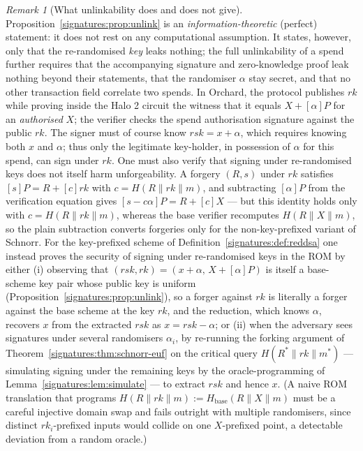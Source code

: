 \documentclass[11pt,a4paper]{article}
\theoremstyle{definition}
\theoremstyle{remark}
\newtheorem{remark}[theorem]{Remark}
\begin{document}
\begin{remark}[What unlinkability does and does not give]\label{signatures:rem:unlink}
Proposition~\ref{signatures:prop:unlink} is an \emph{information-theoretic} (perfect) statement: it does not rest on any computational assumption. It states, however, only that the re-randomised \emph{key} leaks nothing; the full unlinkability of a spend further requires that the accompanying signature and zero-knowledge proof leak nothing beyond their statements, that the randomiser \(\alpha\) stay secret, and that no other transaction field correlate two spends. In Orchard, the protocol publishes \(\mathit{rk}\) while proving inside the Halo 2 circuit the witness that it equals \(X + [\alpha]P\) for an \emph{authorised} \(X\); the verifier checks the spend authorisation signature against the public \(\mathit{rk}\). The signer must of course know \(\mathit{rsk} = x + \alpha\), which requires knowing both \(x\) and \(\alpha\); thus only the legitimate key-holder, in possession of \(\alpha\) for this spend, can sign under \(\mathit{rk}\). One must also verify that signing under re-randomised keys does not itself harm unforgeability. A forgery \((R, s)\) under \(\mathit{rk}\) satisfies \([s]P = R + [c]\mathit{rk}\) with \(c = H(R \| \mathit{rk} \| m)\), and subtracting \([\alpha]P\) from the verification equation gives \([s - c\alpha]P = R + [c]X\) --- but this identity holds only with \(c = H(R \| \mathit{rk} \| m)\), whereas the base verifier recomputes \(H(R \| X \| m)\), so the plain subtraction converts forgeries only for the non-key-prefixed variant of Schnorr. For the key-prefixed scheme of Definition~\ref{signatures:def:reddsa} one instead proves the security of signing under re-randomised keys in the ROM by either (i) observing that \((\mathit{rsk}, \mathit{rk}) = (x + \alpha,\, X + [\alpha]P)\) is itself a base-scheme key pair whose public key is uniform (Proposition~\ref{signatures:prop:unlink}), so a forger against \(\mathit{rk}\) is literally a forger against the base scheme at the key \(\mathit{rk}\), and the reduction, which knows \(\alpha\), recovers \(x\) from the extracted \(\mathit{rsk}\) as \(x = \mathit{rsk} - \alpha\); or (ii) when the adversary sees signatures under several randomisers \(\alpha_i\), by re-running the forking argument of Theorem~\ref{signatures:thm:schnorr-euf} on the critical query \(H(R^\ast \| \mathit{rk} \| m^\ast)\) --- simulating signing under the remaining keys by the oracle-programming of Lemma~\ref{signatures:lem:simulate} --- to extract \(\mathit{rsk}\) and hence \(x\). (A naive ROM translation that programs \(H(R \| \mathit{rk} \| m) := H_{\mathrm{base}}(R \| X \| m)\) must be a careful injective domain swap and fails outright with multiple randomisers, since distinct \(\mathit{rk}_i\)-prefixed inputs would collide on one \(X\)-prefixed point, a detectable deviation from a random oracle.)
\end{remark}
\end{document}
